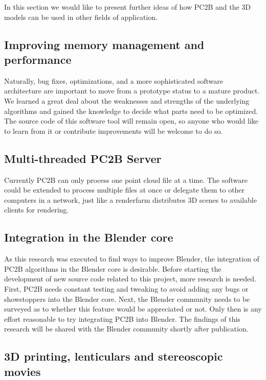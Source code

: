 In this section we would like to present further ideas of how PC2B and the 3D models can be used in other fields of application.

\subsection{Improving memory management and performance}

Naturally, bug fixes, optimizations, and a more sophisticated software architecture are important to move from a prototype status to a mature product. We learned a great deal about the weaknesses and strengths of the underlying algorithms and gained the knowledge to decide what parts need to be optimized. The source code of this software tool will remain open, so anyone who would like to learn from it or contribute improvements will be welcome to do so.

\subsection{Multi-threaded PC2B Server}

Currently PC2B can only process one point cloud file at a time. The software could be extended to process multiple files at once or delegate them to other computers in a network, just like a renderfarm distributes 3D scenes to available clients for rendering.

\subsection{Integration in the Blender core}

As this research was executed to find ways to improve Blender, the integration of PC2B algorithms in the Blender core is desirable. Before starting the development of new source code related to this project, more research is needed. First, PC2B needs constant testing and tweaking to avoid adding any bugs or showstoppers into the Blender core. Next, the Blender community needs to be surveyed as to whether this feature would be appreciated or not. Only then is any effort reasonable to try integrating PC2B into Blender. The findings of this research will be shared with the Blender community shortly after publication.

\subsection{3D printing, lenticulars and stereoscopic movies}

